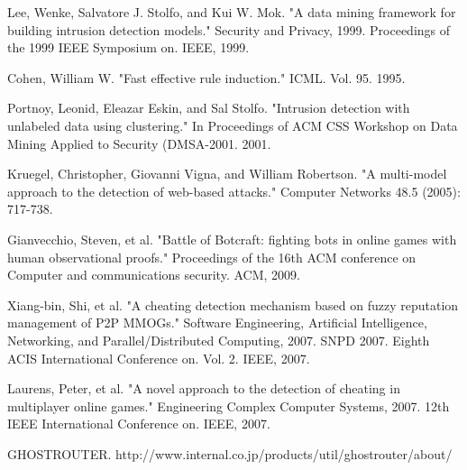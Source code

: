 \documentclass[a4paper,11pt]{jsarticle}
\begin{document}
\begin{thebibliography}{99}
Lee, Wenke, Salvatore J. Stolfo, and Kui W. Mok. "A data mining framework for building intrusion detection models." Security and Privacy, 1999. Proceedings of the 1999 IEEE Symposium on. IEEE, 1999.

Cohen, William W. "Fast effective rule induction." ICML. Vol. 95. 1995.

Portnoy, Leonid, Eleazar Eskin, and Sal Stolfo. "Intrusion detection with unlabeled data using clustering." In Proceedings of ACM CSS Workshop on Data Mining Applied to Security (DMSA-2001. 2001.

Kruegel, Christopher, Giovanni Vigna, and William Robertson. "A multi-model approach to the detection of web-based attacks." Computer Networks 48.5 (2005): 717-738.

Gianvecchio, Steven, et al. "Battle of Botcraft: fighting bots in online games with human observational proofs." Proceedings of the 16th ACM conference on Computer and communications security. ACM, 2009.

Xiang-bin, Shi, et al. "A cheating detection mechanism based on fuzzy reputation management of P2P MMOGs." Software Engineering, Artificial Intelligence, Networking, and Parallel/Distributed Computing, 2007. SNPD 2007. Eighth ACIS International Conference on. Vol. 2. IEEE, 2007.

Laurens, Peter, et al. "A novel approach to the detection of cheating in multiplayer online games." Engineering Complex Computer Systems, 2007. 12th IEEE International Conference on. IEEE, 2007.

GHOSTROUTER. http://www.internal.co.jp/products/util/ghostrouter/about/

\end{thebibliography}

%
%
\end{document}
